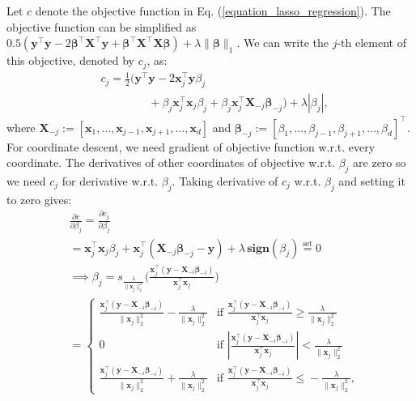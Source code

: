 \documentclass[lang=cn,10pt]{gorgeousnbook}
\numberwithin{equation}{section}%
\numberwithin{figure}{section}%
\begin{document}
Let $c$ denote the objective function in Eq. (\ref{equation_lasso_regression}). 
The objective function can be simplified as $0.5(\boldsymbol{y}^\top \boldsymbol{y} - 2 \boldsymbol{\beta}^\top \boldsymbol{X}^\top \boldsymbol{y} + \boldsymbol{\beta}^\top \boldsymbol{X}^\top \boldsymbol{X} \boldsymbol{\beta}) + \lambda \|\boldsymbol{\beta}\|_1$. 
We can write the $j$-th element of this objective, denoted by $c_j$, as:
\begin{align*}
& c_j = \frac{1}{2} (\boldsymbol{y}^\top \boldsymbol{y} - 2 \boldsymbol{x}_j^\top \boldsymbol{y} \beta_j \\
&~~~~~~~~~~~~~~~~~~~ + \beta_j \boldsymbol{x}_j^\top \boldsymbol{x}_j \beta_j + \beta_j \boldsymbol{x}_j^\top \boldsymbol{X}_{-j} \boldsymbol{\beta}_{-j}) + \lambda |\beta_j|,
\end{align*}
where $\boldsymbol{X}_{-j} := [\boldsymbol{x}_1, \dots, \boldsymbol{x}_{j-1}, \boldsymbol{x}_{j+1}, \dots, \boldsymbol{x}_d]$ and $\boldsymbol{\beta}_{-j} := [\beta_1, \dots, \beta_{j-1}, \beta_{j+1}, \dots, \beta_d]^\top$. 
For coordinate descent, we need gradient of objective function w.r.t. every coordinate. 
The derivatives of other coordinates of objective w.r.t. $\beta_j$ are zero so we need $c_j$ for derivative w.r.t. $\beta_j$. 
Taking derivative of $c_j$ w.r.t. $\beta_j$ and setting it to zero gives:
\begin{align*}
&\frac{\partial c}{\partial \beta_j} = \frac{\partial c_j}{\partial \beta_j} \\
&= \boldsymbol{x}_j^\top \boldsymbol{x}_j \beta_j + \boldsymbol{x}_j^\top (\boldsymbol{X}_{-j} \boldsymbol{\beta}_{-j} - \boldsymbol{y}) + \lambda\, \textbf{sign}(\beta_j) \overset{\text{set}}{=} 0 \\
&\implies 
\beta_j = s_{\frac{\lambda}{\|\boldsymbol{x}_j\|_2^2}}\Big(\frac{\boldsymbol{x}_j^\top (\boldsymbol{y} - \boldsymbol{X}_{-i} \boldsymbol{\beta}_{-i})}{\boldsymbol{x}_j^\top \boldsymbol{x}_j}\Big) \\
&=
\left\{
    \begin{array}{ll}
        \frac{\boldsymbol{x}_j^\top (\boldsymbol{y} - \boldsymbol{X}_{-i} \boldsymbol{\beta}_{-i})}{\|\boldsymbol{x}_j\|_2^2} - \frac{\lambda}{\|\boldsymbol{x}_j\|_2^2} & \mbox{if } \frac{\boldsymbol{x}_j^\top (\boldsymbol{y} - \boldsymbol{X}_{-i} \boldsymbol{\beta}_{-i})}{\boldsymbol{x}_j^\top \boldsymbol{x}_j} \geq \frac{\lambda}{\|\boldsymbol{x}_j\|_2^2} \\
        0 & \mbox{if } |\frac{\boldsymbol{x}_j^\top (\boldsymbol{y} - \boldsymbol{X}_{-i} \boldsymbol{\beta}_{-i})}{\boldsymbol{x}_j^\top \boldsymbol{x}_j}|\! <\! \frac{\lambda}{\|\boldsymbol{x}_j\|_2^2} \\
        \frac{\boldsymbol{x}_j^\top (\boldsymbol{y} - \boldsymbol{X}_{-i} \boldsymbol{\beta}_{-i})}{\|\boldsymbol{x}_j\|_2^2} + \frac{\lambda}{\|\boldsymbol{x}_j\|_2^2} & \mbox{if } \frac{\boldsymbol{x}_j^\top (\boldsymbol{y} - \boldsymbol{X}_{-i} \boldsymbol{\beta}_{-i})}{\boldsymbol{x}_j^\top \boldsymbol{x}_j}\! \leq\! -\frac{\lambda}{\|\boldsymbol{x}_j\|_2^2},
    \end{array}
\right.
\end{align*}
\end{document}
